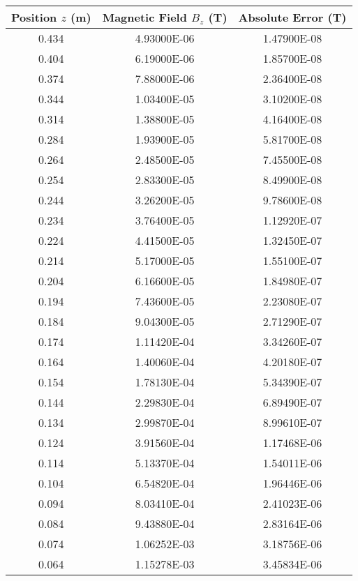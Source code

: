 \begin{appendix}
	\begin{table}[H]
		\centering
		\begin{tabular}{c|c|c}
			Position $z$ (m) & Magnetic Field $B_z$ (T) & Absolute Error (T) \\
			\hline\hline
			0.434 & 4.93000E-06 & 1.47900E-08 \\ \hline
			0.404 & 6.19000E-06 & 1.85700E-08 \\ \hline
			0.374 & 7.88000E-06 & 2.36400E-08 \\ \hline
			0.344 & 1.03400E-05 & 3.10200E-08 \\ \hline
			0.314 & 1.38800E-05 & 4.16400E-08 \\ \hline
			0.284 & 1.93900E-05 & 5.81700E-08 \\ \hline
			0.264 & 2.48500E-05 & 7.45500E-08 \\ \hline
			0.254 & 2.83300E-05 & 8.49900E-08 \\ \hline
			0.244 & 3.26200E-05 & 9.78600E-08 \\ \hline
			0.234 & 3.76400E-05 & 1.12920E-07 \\ \hline
			0.224 & 4.41500E-05 & 1.32450E-07 \\ \hline
			0.214 & 5.17000E-05 & 1.55100E-07 \\ \hline
			0.204 & 6.16600E-05 & 1.84980E-07 \\ \hline
			0.194 & 7.43600E-05 & 2.23080E-07 \\ \hline
			0.184 & 9.04300E-05 & 2.71290E-07 \\ \hline
			0.174 & 1.11420E-04 & 3.34260E-07 \\ \hline
			0.164 & 1.40060E-04 & 4.20180E-07 \\ \hline
			0.154 & 1.78130E-04 & 5.34390E-07 \\ \hline
			0.144 & 2.29830E-04 & 6.89490E-07 \\ \hline
			0.134 & 2.99870E-04 & 8.99610E-07 \\ \hline
			0.124 & 3.91560E-04 & 1.17468E-06 \\ \hline
			0.114 & 5.13370E-04 & 1.54011E-06 \\ \hline
			0.104 & 6.54820E-04 & 1.96446E-06 \\ \hline
			0.094 & 8.03410E-04 & 2.41023E-06 \\ \hline
			0.084 & 9.43880E-04 & 2.83164E-06 \\ \hline
			0.074 & 1.06252E-03 & 3.18756E-06 \\ \hline
			0.064 & 1.15278E-03 & 3.45834E-06 \\ \hline

\end{tabular}
\end{table}
\end{appendix}
